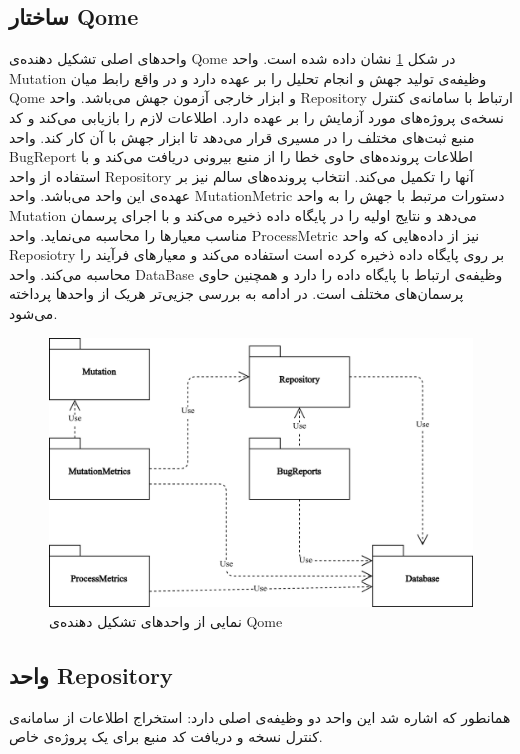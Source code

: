 \subsection{ساختار Qome}
واحدهای اصلی تشکیل دهنده‌ی Qome در شکل \ref{fig:jpredict-module} نشان داده شده‌ است. واحد Mutation وظیفه‌ی تولید جهش و انجام تحلیل را بر عهده دارد و در واقع رابط میان Qome و ابزار  خارجی آزمون جهش می‌باشد. واحد Repository ارتباط با سامانه‌ی کنترل نسخه‌ی پروژه‌های مورد آزمایش را بر عهده دارد. اطلاعات لازم را بازیابی می‌کند و کد منبع ثبت‌های مختلف را در مسیری قرار می‌دهد تا ابزار جهش با آن کار کند. واحد BugReport اطلاعات پرونده‌های حاوی خطا را از منبع بیرونی دریافت می‌کند و با استفاده از واحد Repository آنها را تکمیل می‌کند.  انتخاب پرونده‌های سالم نیز بر عهده‌ی این واحد می‌باشد. واحد MutationMetric دستورات مرتبط با جهش  را به واحد Mutation می‌دهد و نتایج اولیه را در پایگاه داده ذخیره می‌کند و با اجرای پرسمان مناسب معیارها را محاسبه می‌نماید. واحد ProcessMetric نیز  از داده‌هایی که واحد Reposiotry بر روی پایگاه داده ذخیره کرده است استفاده می‌کند و معیارهای فرآیند را محاسبه می‌کند. واحد DataBase وظیفه‌ی ارتباط با پایگاه داده‌ را دارد و همچنین حاوی پرسمان‌های مختلف است. در ادامه به بررسی جزیی‌تر هریک از واحدها پرداخته می‌شود.


\begin{figure}[H]
	\centering
	\includegraphics[width=.8\textwidth]{img/method/component-jpredict.png}
	\caption{ نمایی از واحدهای تشکیل دهنده‌ی Qome}
	\label{fig:jpredict-module}
\end{figure}

\subsection{واحد  Repository}
 
همانطور که اشاره شد این واحد دو وظیفه‌ی اصلی دارد: استخراج اطلاعات از سامانه‌ی کنترل نسخه و دریافت کد منبع برای یک پروژه‌ی خاص. 

